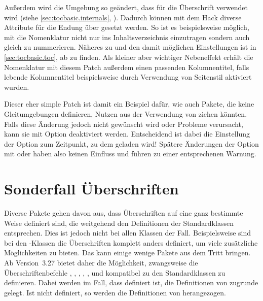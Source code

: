 Außerdem wird die Umgebung
 so geändert,
dass  für
die Überschrift verwendet wird (siehe \autoref{sec:tocbasic.internals},
). Dadurch können mit dem Hack
diverse Attribute für die Endung  über
%
 gesetzt werden. So ist es
beispielsweise möglich, mit
 die
Nomenklatur nicht nur ins Inhaltsverzeichnis einzutragen sondern auch gleich
zu nummerieren. Näheres zu  und den damit
möglichen Einstellungen ist in \autoref{sec:tocbasic.toc}, ab
 zu finden.  Als kleiner aber wichtiger
Nebeneffekt erhält die Nomenklatur mit diesem Patch außerdem einen passenden
Kolumnentitel, falls lebende Kolumnentitel beispielsweise durch Verwendung von
Seitenstil  aktiviert wurden.

Dieser eher simple Patch ist damit ein Beispiel dafür, wie auch Pakete, die
keine Gleitumgebungen definieren, Nutzen aus der Verwendung von
 ziehen könnten.  Falls diese Änderung jedoch nicht
gewünscht wird oder Probleme verursacht, kann sie mit Option
deaktiviert werden. Entscheidend ist dabei die Einstellung
der Option zum Zeitpunkt, zu dem  geladen wird! Spätere
Änderungen der Option mit  oder
 haben also keinen Einfluss und führen zu
einer entsprechenen Warnung.%


\section{Sonderfall Überschriften}

Diverse Pakete gehen davon aus, dass
Überschriften auf eine ganz bestimmte Weise definiert sind, die weitgehend den
Definitionen der Standardklassen entsprechen. Dies ist jedoch nicht bei allen
Klassen der Fall. Beispielsweise sind bei den \KOMAScript-Klassen die
Überschriften komplett anders definiert, um viele zusätzliche Möglichkeiten zu
bieten. Das kann einige wenige Pakete aus dem Tritt bringen. Ab Version~3.27
bietet  daher die Möglichkeit, zwangsweise die
Überschriftenbefehle ,
,
,
,
,
 und
 kompatibel zu den
Standardklassen zu definieren. Dabei werden im Fall, dass
 definiert ist, die Definitionen von 
zugrunde gelegt. Ist  nicht definiert, so werden
die Definitionen von  herangezogen.

